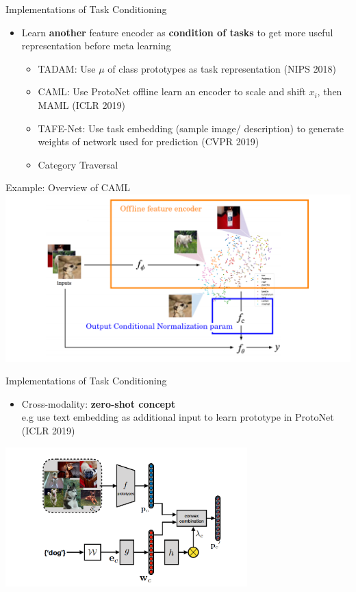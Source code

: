 \documentclass{beamer}
\begin{document}
\begin{frame}{Implementations of Task Conditioning}
  \begin{itemize}
    \item Learn \textbf{another} feature encoder as \textbf{condition of tasks} to get more useful representation before meta learning
      \begin{itemize}[<+->]
        \item TADAM: Use $\mu$ of class prototypes as task representation (NIPS 2018)
        \item CAML: Use ProtoNet offline learn an encoder to scale and shift $x_i$, then MAML (ICLR 2019)
        \item TAFE-Net: Use task embedding (sample image/ description) to generate weights of network used for prediction (CVPR 2019)
        \item Category Traversal
      \end{itemize}
  \end{itemize}
\end{frame}

\begin{frame}{Example: Overview of CAML}
  \center \includegraphics[width=1.0\textwidth]{fig/caml.png}
\end{frame}

\begin{frame}{Implementations of Task Conditioning}
  \begin{itemize}
    \item Cross-modality: \textbf{zero-shot concept} \\
      e.g use text embedding as additional input to learn prototype in ProtoNet (ICLR 2019)
  \end{itemize}
  \center \includegraphics[width=0.7\textwidth]{fig/cross-modal.png}
\end{frame}
\end{document}
